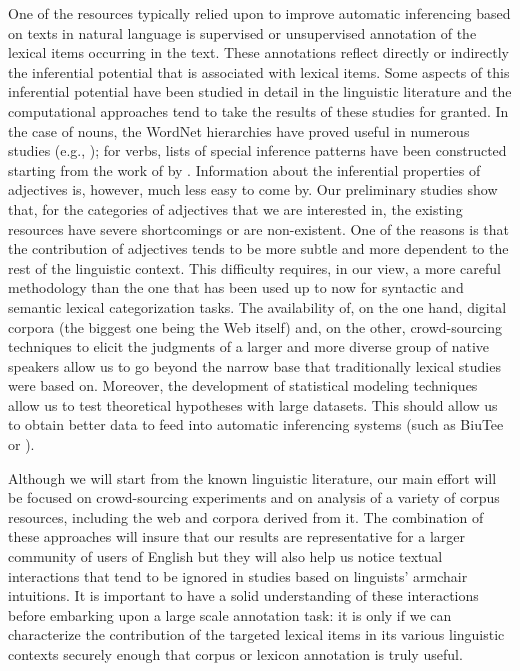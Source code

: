 \documentclass[10pt]{article}
\begin{document}
One of the resources  typically relied upon to improve automatic inferencing based on texts in natural language is supervised or unsupervised annotation of the lexical items occurring in the text. These annotations reflect directly or indirectly the inferential potential that is associated with lexical items. Some aspects of this inferential potential have been studied in detail in the linguistic literature and the computational approaches tend to take the results of these studies for granted. 
In the case of nouns, the WordNet hierarchies have proved useful in numerous studies (e.g., \cite{snow04}); for verbs, lists of special inference patterns have been constructed starting from the work of \cite{kiparsky+kiparsky:1970,karttunen:1971} by \cite{nairn+condoravdi+karttunen:2006,sauri:2008phd,factbank:2009,lotan:2012}. Information about the inferential properties of adjectives is, however, much less easy to come by. Our preliminary studies show that, for the categories of adjectives that we are interested in, the existing resources have severe shortcomings or are non-existent. One of the reasons is that the contribution of adjectives tends to be more subtle and more dependent to the rest of the linguistic context. This difficulty requires, in our view, a more careful methodology than the one that has been used up to now for syntactic and semantic lexical categorization tasks. The availability of, on the one hand, digital corpora (the biggest one being the Web itself) and, on the other, crowd-sourcing techniques to elicit the judgments of a larger and more diverse group of native speakers allow us to go beyond the narrow base that traditionally lexical studies were based on. Moreover, the development of statistical modeling techniques allow us to test theoretical hypotheses with large datasets. This should allow us to obtain better data to feed into automatic inferencing systems (such as BiuTee \cite{stern+dagan:2011} or \cite{clark2007role}).
 
Although we will start from the known linguistic literature, our main effort will be focused on crowd-sourcing experiments and on analysis of a variety of corpus resources, including the web and corpora derived from it. The combination of these approaches will insure that our results are representative for a larger community of users of English but they will also help us notice textual interactions that tend to be ignored in studies based on linguists' armchair intuitions. It is important to have a solid understanding of these interactions before embarking upon a large scale annotation task: it is only if we can characterize the contribution of the targeted lexical items in its various linguistic contexts securely enough that corpus or lexicon annotation is truly useful. 
\end{document}
